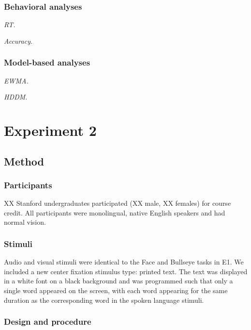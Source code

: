 \documentclass[10pt, letterpaper]{article}
\begin{document}
\subsubsection{Behavioral analyses}\label{behavioral-analyses}

\emph{RT.}

\emph{Accuracy.}

\subsubsection{Model-based analyses}\label{model-based-analyses}

\emph{EWMA.}

\emph{HDDM.}

\section{Experiment 2}\label{experiment-2}

\subsection{Method}\label{method-1}

\subsubsection{Participants}\label{participants-1}

XX Stanford undergraduates participated (XX male, XX females) for course
credit. All participants were monolingual, native English speakers and
had normal vision.

\subsubsection{Stimuli}\label{stimuli-1}

Audio and visual stimuli were identical to the Face and Bullseye tasks
in E1. We included a new center fixation stimulus type: printed text.
The text was displayed in a white font on a black background and was
programmed such that only a single word appeared on the screen, with
each word appearing for the same duration as the corresponding word in
the spoken language stimuli.

\subsubsection{Design and procedure}\label{design-and-procedure-1}
\end{document}
